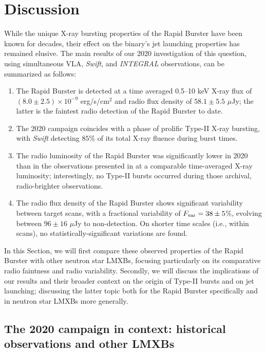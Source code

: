 \documentclass[fleqn,usenatbib]{mnras}
\begin{document}

\section{Discussion}
\label{sec:discussion}
    
While the unique X-ray bursting properties of the Rapid Burster have been known for decades, their effect on the binary's jet launching properties has remained elusive. The main results of our 2020 investigation of this question, using simultaneous VLA, \textit{Swift}, and \textit{INTEGRAL} observations, can be summarized as follows:
\begin{enumerate}
    \item The Rapid Burster is detected at a time averaged 0.5--10 keV X-ray flux of $(8.0\pm2.5)\times10^{-9}$ erg/s/cm$^2$ and radio flux density of $58.1 \pm 5.5$ $\mu$Jy; the latter is the faintest radio detection of the Rapid Burster to date. 
    \item The 2020 campaign coincides with a phase of prolific Type-II X-ray bursting, with \textit{Swift} detecting $85$\% of its total X-ray fluence during burst times.
    \item The radio luminosity of the Rapid Burster was significantly lower in 2020 than in the observations presented in \citet{moore2000} at a comparable time-averaged X-ray luminosity; interestingly, no Type-II bursts occurred during those archival, radio-brighter observations. 
    \item The radio flux density of the Rapid Burster shows significant variability between target scans, with a fractional variability of $F_{\rm var} = 38 \pm 5$\%, evolving between $96\pm16$ $\mu$Jy to non-detection. On shorter time scales (i.e., within scans), no statistically-significant variations are found. 
\end{enumerate}

In this Section, we will first compare these observed properties of the Rapid Burster with other neutron star LMXBs, focusing particularly on its comparative radio faintness and radio variability. Secondly, we will discuss the implications of our results and their broader context on the origin of Type-II bursts and on jet launching; discussing the latter topic both for the Rapid Burster specifically and in neutron star LMXBs more generally. 

\subsection{The 2020 campaign in context: historical observations and other LMXBs}
\end{document}

